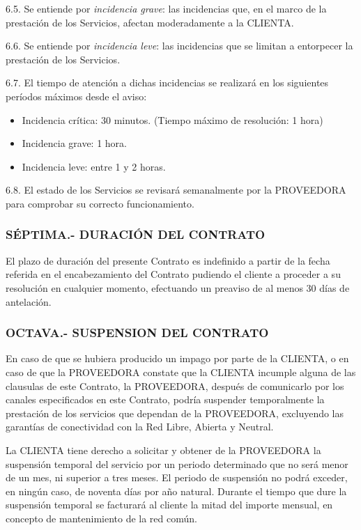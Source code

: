 \documentclass[11pt,spanish,a4paper,]{article}
\begin{document}
6.5. Se entiende por \emph{incidencia grave}: las incidencias que, en el
marco de la prestación de los Servicios, afectan moderadamente a la
CLIENTA.

6.6. Se entiende por \emph{incidencia leve}: las incidencias que se
limitan a entorpecer la prestación de los Servicios.

6.7. El tiempo de atención a dichas incidencias se realizará en los
siguientes períodos máximos desde el aviso:

\begin{itemize}
\itemsep1pt\parskip0pt
\item
  Incidencia crítica: 30 minutos. (Tiempo máximo de resolución: 1 hora)
\item
  Incidencia grave: 1 hora.
\item
  Incidencia leve: entre 1 y 2 horas.
\end{itemize}

6.8. El estado de los Servicios se revisará semanalmente por la
PROVEEDORA para comprobar su correcto funcionamiento.

\subsubsection{SÉPTIMA.- DURACIÓN DEL
CONTRATO}\label{suxe9ptima.--duraciuxf3n-del-contrato}

El plazo de duración del presente Contrato es indefinido a partir de la
fecha referida en el encabezamiento del Contrato pudiendo el cliente a
proceder a su resolución en cualquier momento, efectuando un preaviso de
al menos 30 días de antelación.

\subsubsection{OCTAVA.- SUSPENSION DEL
CONTRATO}\label{octava.--suspension-del-contrato}

En caso de que se hubiera producido un impago por parte de la CLIENTA, o
en caso de que la PROVEEDORA constate que la CLIENTA incumple alguna de
las clausulas de este Contrato, la PROVEEDORA, después de comunicarlo
por los canales especificados en este Contrato, podría suspender
temporalmente la prestación de los servicios que dependan de la
PROVEEDORA, excluyendo las garantías de conectividad con la Red Libre,
Abierta y Neutral.

La CLIENTA tiene derecho a solicitar y obtener de la PROVEEDORA la
suspensión temporal del servicio por un periodo determinado que no será
menor de un mes, ni superior a tres meses. El periodo de suspensión no
podrá exceder, en ningún caso, de noventa días por año natural. Durante
el tiempo que dure la suspensión temporal se facturará al cliente la
mitad del importe mensual, en concepto de mantenimiento de la red común.
\end{document}
